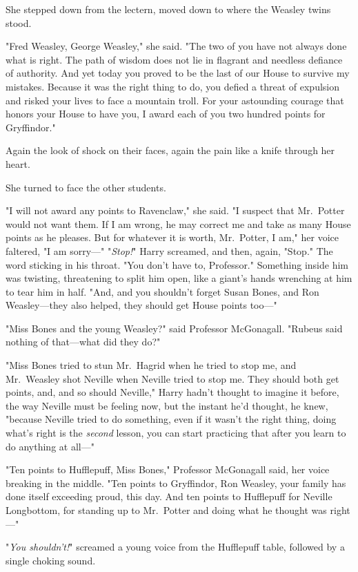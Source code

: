 She stepped down from the lectern, moved down to where the Weasley twins stood.

"Fred Weasley, George Weasley," she said. "The two of you have not always done
what is right. The path of wisdom does not lie in flagrant and needless
defiance of authority. And yet today you proved to be the last of our House to
survive my mistakes. Because it was the right thing to do, you defied a threat
of expulsion and risked your lives to face a mountain troll. For your
astounding courage that honors your House to have you, I award each of you two
hundred points for Gryffindor."

Again the look of shock on their faces, again the pain like a knife through her
heart.

She turned to face the other students.

"I will not award any points to Ravenclaw," she said. "I suspect that
Mr.~Potter would not want them. If I am wrong, he may correct me and take as
many House points as he pleases. But for whatever it is worth, Mr.~Potter, I
am," her voice faltered, "I am sorry—"
\sbreak
"\emph{Stop!}" Harry screamed, and then, again, "Stop." The word sticking in
his throat. "You don't have to, Professor." Something inside him was twisting,
threatening to split him open, like a giant's hands wrenching at him to tear
him in half. "And, and you shouldn't forget Susan Bones, and Ron Weasley—they
also helped, they should get House points too—"

"Miss Bones and the young Weasley?" said Professor McGonagall. "Rubeus said
nothing of that—what did they do?"

"Miss Bones tried to stun Mr.~Hagrid when he tried to stop me, and
Mr.~Weasley shot Neville when Neville tried to stop me. They should both get
points, and, and so should Neville," Harry hadn't thought to imagine it before,
the way Neville must be feeling now, but the instant he'd thought, he knew,
"because Neville tried to do something, even if it wasn't the right thing,
doing what's right is the \emph{second} lesson, you can start practicing that
after you learn to do anything at all—"

"Ten points to Hufflepuff, Miss Bones," Professor McGonagall said, her voice
breaking in the middle. "Ten points to Gryffindor, Ron Weasley, your family has
done itself exceeding proud, this day. And ten points to Hufflepuff for Neville
Longbottom, for standing up to Mr.~Potter and doing what he thought was
right—"

"\emph{You shouldn't!}" screamed a young voice from the Hufflepuff table,
followed by a single choking sound.

